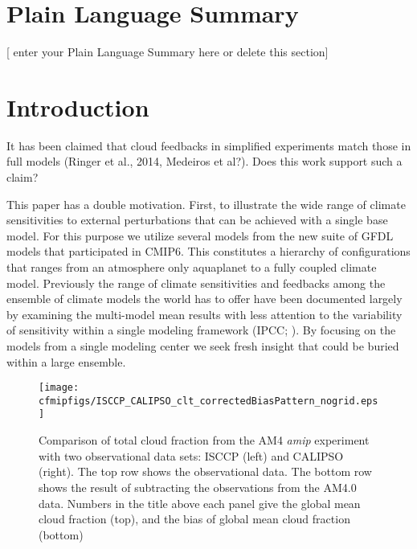 \documentclass[draft]{agujournal2019}
\begin{document}
\section*{Plain Language Summary}
[ enter your Plain Language Summary here or delete this section]


\section{Introduction}


It has been claimed that cloud feedbacks in simplified experiments match those in full models (Ringer et al., 2014, Medeiros et al?).  
Does this work support such a claim? 

This paper has a double motivation.  First, to illustrate the wide range of climate sensitivities to external perturbations 
that can be achieved with a single base model.  For this purpose we utilize several models from the new suite of GFDL 
models that participated in CMIP6.  This constitutes a hierarchy of configurations that ranges from an atmosphere only 
aquaplanet to a fully coupled 
climate model.  Previously the range of climate sensitivities and feedbacks among the ensemble of climate models 
the world has to offer have been documented largely by examining the multi-model mean results with less attention to 
the variability of sensitivity within a single modeling framework (IPCC; ).  By 
focusing on the models from a single modeling center we seek fresh insight that could be buried within a large ensemble.

\begin{figure}
  \centering
  \texttt{[image: cfmipfigs/ISCCP\_CALIPSO\_clt\_correctedBiasPattern\_nogrid.eps]}
   \caption{Comparison of total cloud fraction from the AM4 \textit{amip} experiment with two observational 
  data sets: ISCCP (left) and CALIPSO (right).  The top row shows the observational data.  The bottom row
  shows the result of subtracting the observations from the AM4.0 data.  Numbers in the title above each 
  panel give the global mean cloud fraction (top), and the bias of global mean cloud fraction (bottom)}
  \label{fig:clt_isccp_calipso}
\end{figure}
\end{document}
